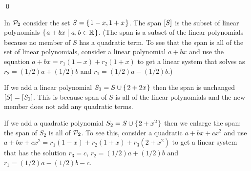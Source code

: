 \documentclass[10pt,t]{beamer}
\begin{document}
\begin{frame}
\lm[lm:ExpandSpanByAddingNonRepeat]

\pause
\pf
{}

\pause
{}

\pause
{}
\qed
\end{frame}



\begin{frame}
\ex 
In $\mathcal{P}_2$ consider the set $S=\mbox{$\{\hspace{0.1em}1-x,1+x\hspace{0.1em}\}$}$.
The span $\relax [S\relax ]$ is the subset of
linear polynomials $\mbox{$\{\hspace{0.1em}a+bx\bigm| a,b\in\mathbb{R}\hspace{0.1em}\}$}$.
(The span is a subset of the linear polynomials because no member of
$S$ has a quadratic term.
To see that the span is all of the set of linear polynomials, consider 
a linear polynomial $a+bx$ and use
the equation $a+bx=r_1(1-x)+r_2(1+x)$ to get a linear system
that solves as $r_2=(1/2)a+(1/2)b$ and 
$r_1=(1/2)a-(1/2)b$.)  

\pause
If we add a linear polynomial $S_1=S\cup\mbox{$\{\hspace{0.1em}2+2x\hspace{0.1em}\}$}$
then the span is unchanged $\relax [S\relax ]=\relax [S_1\relax ]$.
This is because span of $S$ is all of the linear polynomials 
and the new 
member does not add any quadratic terms.

\pause
If we add a quadratic polynomial 
$S_2=S\cup\mbox{$\{\hspace{0.1em}2+x^2\hspace{0.1em}\}$}$ then we enlarge the span: 
the span of $S_2$ is all of $\mathcal{P}_2$.
To see this, consider a quadratic $a+bx+cx^2$ and use  
$a+bx+cx^2=r_1(1-x)+r_2(1+x)+r_3(2+x^2)$ to get a linear system
that has the solution $r_3=c$, $r_2=(1/2)a+(1/2)b$ and $r_1=(1/2)a-(1/2)b-c$.
\end{frame}
\end{document}
